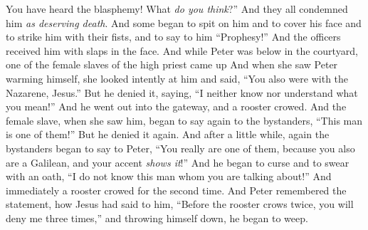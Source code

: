 \begin{biblechapter}
\verse You have heard the blasphemy! What \textit{do you think}?” And they all condemned him \textit{as deserving death}.
\verse And some began to spit on him and to cover his face and to strike him with their fists, and to say to him “Prophesy!” And the officers received him with slaps in the face.
 And while Peter was below in the courtyard, one of the female slaves of the high priest came up
\verse And when she saw Peter warming himself, she looked intently at him and said, “You also were with the Nazarene, Jesus.”
\verse But he denied it, saying, “I neither know nor understand what you mean!” And he went out into the gateway, and a rooster crowed.
\verse And the female slave, when she saw him, began to say again to the bystanders, “This man is one of them!”
\verse But he denied it again. And after a little while, again the bystanders began to say to Peter, “You really are one of them, because you also are a Galilean, and your accent \textit{shows it}!”
\verse And he began to curse and to swear with an oath, “I do not know this man whom you are talking about!”
\verse And immediately a rooster crowed for the second time. And Peter remembered the statement, how Jesus had said to him, “Before the rooster crows twice, you will deny me three times,” and throwing himself down, he began to weep.
\end{biblechapter}

